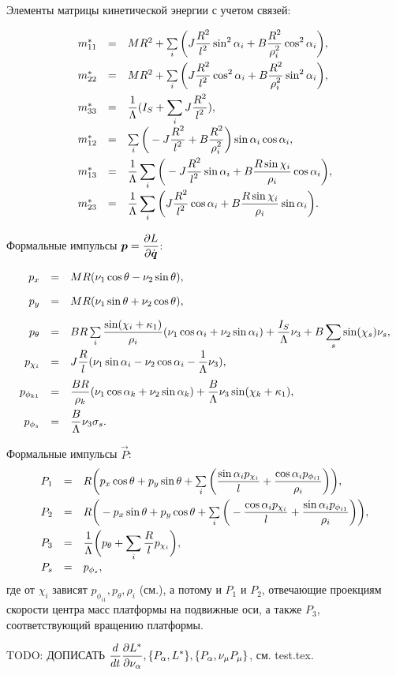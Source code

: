 Элементы матрицы кинетической энергии с учетом связей:

\begin{equation}\label{mstar}
    \begin{array}{rcl}
        m^*_{11} & = & MR^2 + \sum\limits_i \bigg( J\ddfrac{R^2}{l^2}\sin^2\alpha_i + B\ddfrac{R^2}{\rho_i^2}\cos^2\alpha_i\bigg),\vsp
        m^*_{22} & = & MR^2 + \sum\limits_i \bigg(J\ddfrac{R^2}{l^2}\cos^2\alpha_i + B\ddfrac{R^2}{\rho_i^2}\sin^2\alpha_i\bigg),\vsp
        m^*_{33} & = & \ddfrac{1}{\Lambda}(I_S + \sum\limits_i J\ddfrac{R^2}{l^2}),\vsp
        m^*_{12} & = & \sum\limits_i \bigg(-J\ddfrac{R^2}{l^2} + B\ddfrac{R^2}{\rho_i^2}\bigg)\sin\alpha_i\cos\alpha_i,\vsp
        m^*_{13} & = & \ddfrac{1}{\Lambda}\sum\limits_i \bigg(-J\ddfrac{R^2}{l^2}\sin\alpha_i +  B\ddfrac{R\sin\chi_i}{\rho_i}\cos\alpha_i\bigg),\vsp
        m^*_{23} & = & \ddfrac{1}{\Lambda}\sum\limits_i \bigg(J\ddfrac{R^2}{l^2}\cos\alpha_i +  B\ddfrac{R\sin\chi_i}{\rho_i}\sin\alpha_i\bigg).\vsp
    \end{array}
\end{equation}

Формальные импульсы $\vec{p} = \ddpd{L}{\dot{\vec{q}}}$:

\begin{equation}\label{p}
    \begin{array}{rcl}
        p_x & = & MR(\nu_1\cos\theta-\nu_2\sin\theta),\vsp
        p_y & = & MR(\nu_1\sin\theta+\nu_2\cos\theta),\vsp
        p_\theta & = & BR\sum\limits_i\ddfrac{\sin(\chi_i + \kappa_1)}{\rho_i}(\nu_1\cos\alpha_i + \nu_2\sin\alpha_i) + \ddfrac{I_S}{\Lambda}\nu_3 + B\sum\limits_s\sin(\chi_s)\nu_s,\vsp
        p_{\chi_i} & = & J\ddfrac{R}{l}(\nu_1\sin\alpha_i - \nu_2\cos\alpha_i - \ddfrac{1}{\Lambda}\nu_3),\vsp
        p_{\phi_{k1}} & = & \ddfrac{BR}{\rho_k}(\nu_1\cos\alpha_k + \nu_2\sin\alpha_k) + \ddfrac{B}{\Lambda}\nu_3\sin(\chi_k+\kappa_1),\vsp
        p_{\phi_s} & = & \ddfrac{B}{\Lambda}\nu_3\sigma_s.
    \end{array}
\end{equation}

Формальные импульсы $\vec{P}$:
\begin{equation}\label{P}
    \begin{array}{rcl}
        P_1 & = & R\bigg(p_x\cos\theta + p_y\sin\theta + \sum\limits_{i}\bigg(\ddfrac{\sin\alpha_ip_{\chi_i}}{l} +  \ddfrac{\cos\alpha_ip_{\phi_{i1}}}{\rho_i}\bigg)\bigg),\vsp
        P_2 & = & R\bigg(-p_x\sin\theta + p_y\cos\theta + \sum\limits_{i}\bigg(-\ddfrac{\cos\alpha_ip_{\chi_i}}{l} +  \ddfrac{\sin\alpha_ip_{\phi_{i1}}}{\rho_i}\bigg)\bigg),\vsp
        P_3 & = & \ddfrac{1}{\Lambda}\bigg(p_\theta + \sum\limits_{i}\ddfrac{R}{l}p_{\chi_i}\bigg),\vsp
        P_s & = & p_{\phi_s},
    \end{array}
\end{equation}
где от $\chi_i$ зависят $p_{\phi_{i1}}, p_\theta, \rho_i$ (см.), а потому и $P_1$ и $P_2$, отвечающие проекциям скорости центра масс платформы на подвижные оси, а также $P_3$, соответствующий вращению платформы.

TODO: ДОПИСАТЬ $\displaystyle\frac{\displaystyle d}{\displaystyle dt}\frac{\partial L^{*}}{\partial \nu_\alpha}, \{P_\alpha, L^{*}\}, \{P_\alpha, \nu_\mu P_\mu\}$, см. test.tex.